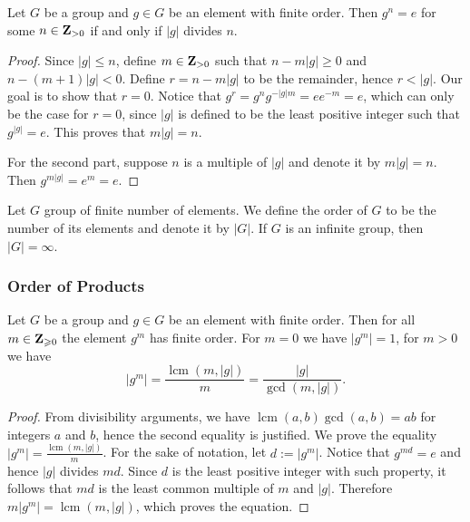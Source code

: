 \begin{lemma}\label{lem: order and multiples}
Let \(G\) be a group and \(g \in G\) be an element with finite order. Then
\(g^n = e\) for some \(n \in \mathbf{Z}_{> 0}\) if and only if \(|g|\) divides
\(n\).
\end{lemma}

\begin{proof}
Since \(|g| \leq n\), define \(m \in \mathbf{Z}_{> 0}\) such that \(n - m |g|
\geq 0\) and \(n - (m + 1) |g| < 0\). Define \(r = n - m |g|\) to be the
remainder, hence \(r < |g|\). Our goal is to show that \(r = 0\). Notice that
\(g^r = g^n g^{-|g| m} = e e^{-m} = e\), which can only be the case for \(r =
0\), since \(|g|\) is defined to be the least positive integer such that
\(g^{|g|} = e\). This proves that \(m |g| = n\).

For the second part, suppose \(n\) is a multiple of \(|g|\) and denote it by
\(m|g| = n\). Then \(g^{m |g|} = e^m = e\).
\end{proof}

\begin{definition}
Let \(G\) group of finite number of elements. We define the order of \(G\) to
be the number of its elements and denote it by \(|G|\). If \(G\) is an
infinite group, then \(|G| = \infty\).
\end{definition}

\subsubsection{Order of Products}

\begin{proposition}\label{prop: order of the power}
Let \(G\) be a group and \(g \in G\) be an element with finite order. Then for
all \(m \in \mathbf{Z}_{\geqslant 0}\) the element \(g^m\) has finite order. For
\(m = 0\) we have \(|g^m| = 1\), for \(m > 0\) we have
\[
  |g^m| = \frac{\operatorname{lcm}(m, |g|)}{m} =
  \frac{|g|}{\operatorname{gcd}(m, |g|)}.
\]
\end{proposition}

\begin{proof}
From divisibility arguments, we have \(\operatorname{lcm}(a, b)
\operatorname{gcd}(a, b) = ab\) for integers \(a\) and \(b\), hence the second
equality is justified. We prove the equality \(|g^m| =
\frac{\operatorname{lcm}(m, |g|)} m\). For the sake of notation, let \(d :=
|g^m|\). Notice that \(g^{m d} = e\) and hence \(|g|\) divides \(m d\). Since
\(d\) is the least positive integer with such property, it follows that \(m
d\) is the least common multiple of \(m\) and \(|g|\). Therefore \(m |g^m| =
\operatorname{lcm}(m, |g|)\), which proves the equation.
\end{proof}

